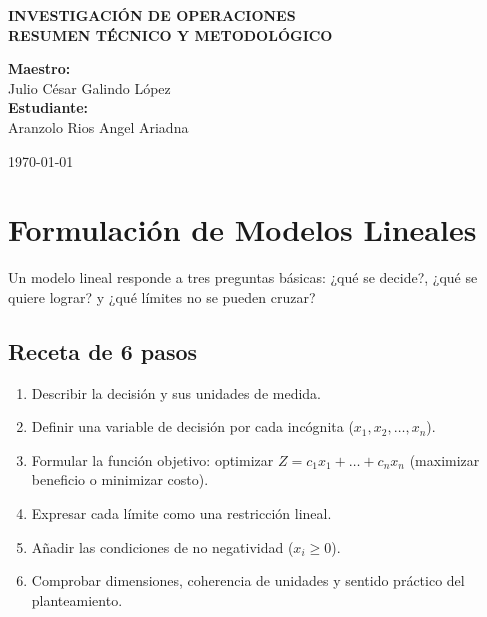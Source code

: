 \documentclass[11pt, a4paper]{article}
\begin{document}
\begin{titlepage}
    \centering
    \vspace*{2cm}
    
    {\Huge \bfseries \color{primary} INVESTIGACIÓN DE OPERACIONES}\\[1.5cm]
    
    {\Large \bfseries RESUMEN TÉCNICO Y METODOLÓGICO}\\[2.5cm]
    
    \begin{minipage}{0.8\textwidth}
        \centering
        \large
        \textbf{Maestro:}\\[0.2cm]
        Julio César Galindo López\\[1.5cm]
        
        \textbf{Estudiante:}\\[0.2cm]
        Aranzolo Rios Angel Ariadna\\
    \end{minipage}
    
    \vfill
    
    {\large \today}
    \vspace*{1.5cm}
\end{titlepage}

\newpage
{}


\section{Formulación de Modelos Lineales}

Un modelo lineal responde a tres preguntas básicas: ¿qué se decide?, ¿qué se quiere lograr? y ¿qué límites no se pueden cruzar?

\subsection*{Receta de 6 pasos}
\begin{enumerate}
    \item Describir la decisión y sus unidades de medida.
    \item Definir una variable de decisión por cada incógnita ($x_1, x_2, \dots, x_n$).
    \item Formular la función objetivo: optimizar $Z = c_1 x_1 + \dots + c_n x_n$ (maximizar beneficio o minimizar costo).
    \item Expresar cada límite como una restricción lineal.
    \item Añadir las condiciones de no negatividad ($x_i \ge 0$).
    \item Comprobar dimensiones, coherencia de unidades y sentido práctico del planteamiento.
\end{enumerate}
\end{document}
